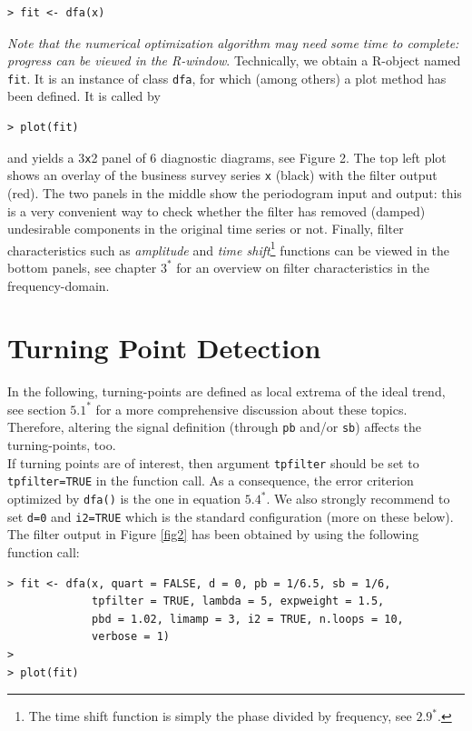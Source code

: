 \documentclass[a4paper]{article}
\begin{document}
\begin{verbatim}
> fit <- dfa(x)
\end{verbatim}
\emph{Note that the numerical optimization algorithm may need some
  time to complete: progress can be viewed in the R-window}. 
Technically, we obtain a R-object named \texttt{fit}. It is an
instance of class \texttt{dfa}, for which (among others) a plot method
has been defined. It is called by
\begin{verbatim}
> plot(fit)
\end{verbatim}
and yields a 3\texttt{x}2 panel of 6 diagnostic diagrams, see Figure
2. The top left plot shows an overlay of the business survey series
\texttt{x} (black) with the filter output (red). The two panels in the
middle show the periodogram input and output: this is a very
convenient way to check whether the filter has removed (damped)
undesirable components in the original time series or not. Finally,
filter characteristics such as \emph{amplitude} and \emph{time
  shift}\footnote{The time shift function is simply the phase divided
  by frequency, see $2.9^*$.} functions can be viewed in the bottom
panels, see chapter $3^*$ for an overview on filter characteristics in
the frequency-domain. 



\section{Turning Point Detection}\label{section5}

In the following, turning-points are defined as local extrema of the
ideal trend, see section $5.1^*$ for a more comprehensive discussion
about these topics. Therefore, altering the signal definition (through
\texttt{pb} and/or \texttt{sb}) affects the turning-points, too.\\


If turning points are of interest, then argument \texttt{tpfilter}
should be set to \texttt{tpfilter=TRUE} in the function call. As a
consequence, the error criterion optimized by \texttt{dfa()} is the
one in equation $5.4^*$. We also strongly recommend to set
\texttt{d=0} and \texttt{i2=TRUE} which is the standard configuration
(more on these below). \\

The filter output in Figure \ref{fig2} has been obtained by using the following function call:
\begin{verbatim}
> fit <- dfa(x, quart = FALSE, d = 0, pb = 1/6.5, sb = 1/6, 
             tpfilter = TRUE, lambda = 5, expweight = 1.5, 
             pbd = 1.02, limamp = 3, i2 = TRUE, n.loops = 10, 
             verbose = 1)
>
> plot(fit)
\end{verbatim}
\end{document}
